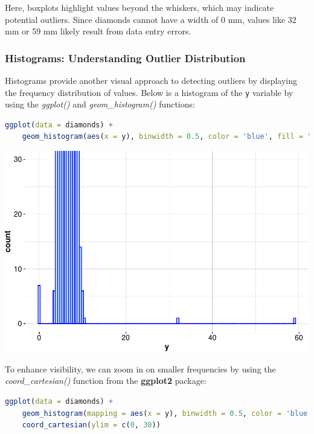 \documentclass[
]{book}
\newcommand{\passthrough}[1]{#1}
\theoremstyle{definition}
\theoremstyle{definition}
\theoremstyle{definition}
\theoremstyle{definition}
\theoremstyle{remark}
\begin{document}
Here, boxplots highlight values beyond the whiskers, which may indicate potential outliers. Since diamonds cannot have a width of 0 mm, values like 32 mm or 59 mm likely result from data entry errors.

\subsubsection*{Histograms: Understanding Outlier Distribution}\label{histograms-understanding-outlier-distribution}

Histograms provide another visual approach to detecting outliers by displaying the frequency distribution of values. Below is a histogram of the \passthrough{\lstinline!y!} variable by using the \emph{ggplot()} and \emph{geom\_histogram()} functions:

\begin{lstlisting}[language=R]
ggplot(data = diamonds) +
    geom_histogram(aes(x = y), binwidth = 0.5, color = 'blue', fill = "lightblue")
\end{lstlisting}

\begin{center}\includegraphics[width=0.7\linewidth]{data-preparation_files/figure-latex/unnamed-chunk-6-1} \end{center}

To enhance visibility, we can zoom in on smaller frequencies by using the \emph{coord\_cartesian()} function from the \textbf{ggplot2} package:

\begin{lstlisting}[language=R]
ggplot(data = diamonds) +
    geom_histogram(mapping = aes(x = y), binwidth = 0.5, color = 'blue', fill = "lightblue") + 
    coord_cartesian(ylim = c(0, 30))
\end{lstlisting}
\end{document}
